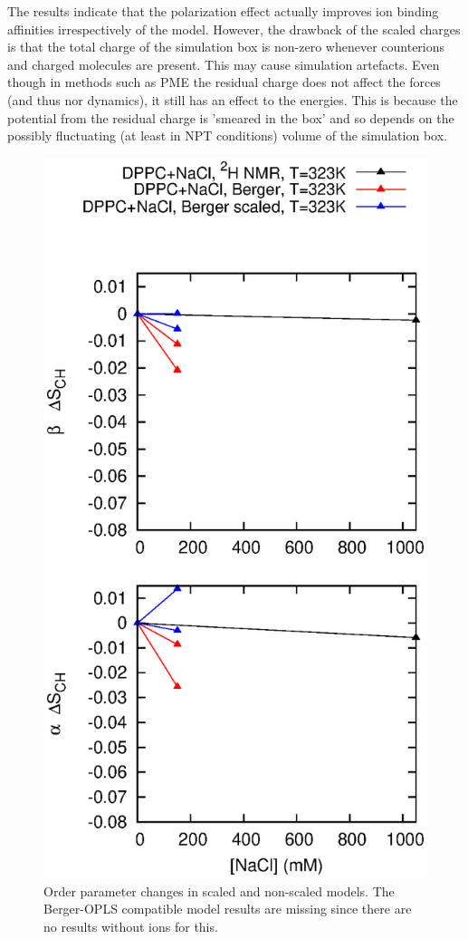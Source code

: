 \documentclass[pre,aps,floatfix,authordate1-4,twocolumn]{revtex4-1}
\begin{document}
The results indicate that the polarization effect actually improves ion binding affinities irrespectively of the model.
However, the drawback of the scaled charges is that the total charge of the simulation box is non-zero whenever
counterions and charged molecules are present. This may cause simulation artefacts. Even though in methods such as
PME the residual charge does not affect the forces (and thus nor dynamics), it still has an effect to the energies.
This is because the potential from the residual charge is 'smeared in the box' and so depends on the possibly
fluctuating (at least in NPT conditions) volume of the simulation box. 

\begin{figure}[]
  \centering
  \includegraphics[width=\textwidth]{../Fig/OrderParameterIONSchangesSCALED.eps} %
  \caption{\label{OPchangesSCALED}
    Order parameter changes in scaled and non-scaled models. The Berger-OPLS compatible model results are missing since there are
    no results without ions for this.
}
\end{figure}
\end{document}
